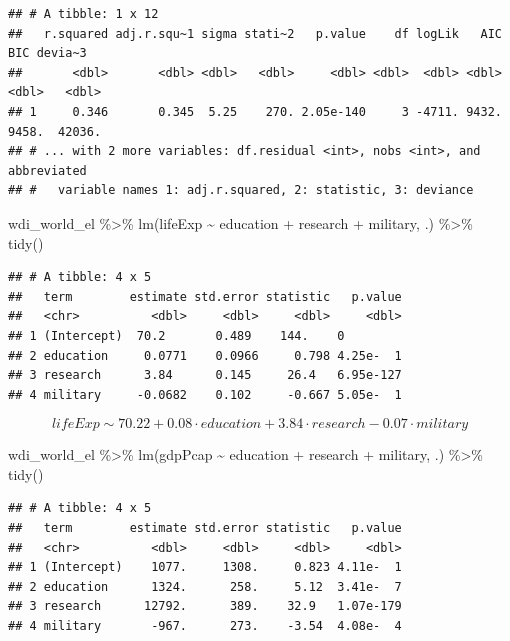 \documentclass[
]{article}
\newenvironment{Shaded}{\begin{snugshade}}{\end{snugshade}}
\newcommand{\FunctionTok}[1]{\textcolor[rgb]{0.00,0.00,0.00}{#1}}
\newcommand{\NormalTok}[1]{#1}
\newcommand{\SpecialCharTok}[1]{\textcolor[rgb]{0.00,0.00,0.00}{#1}}
\begin{document}
\begin{verbatim}
## # A tibble: 1 x 12
##   r.squared adj.r.squ~1 sigma stati~2   p.value    df logLik   AIC   BIC devia~3
##       <dbl>       <dbl> <dbl>   <dbl>     <dbl> <dbl>  <dbl> <dbl> <dbl>   <dbl>
## 1     0.346       0.345  5.25    270. 2.05e-140     3 -4711. 9432. 9458.  42036.
## # ... with 2 more variables: df.residual <int>, nobs <int>, and abbreviated
## #   variable names 1: adj.r.squared, 2: statistic, 3: deviance
\end{verbatim}

\begin{Shaded}
\begin{Highlighting}[]
\NormalTok{wdi\_world\_el }\SpecialCharTok{\%\textgreater{}\%} \FunctionTok{lm}\NormalTok{(lifeExp }\SpecialCharTok{\textasciitilde{}}\NormalTok{ education }\SpecialCharTok{+}\NormalTok{ research }\SpecialCharTok{+}\NormalTok{ military, .) }\SpecialCharTok{\%\textgreater{}\%} \FunctionTok{tidy}\NormalTok{()}
\end{Highlighting}
\end{Shaded}

\begin{verbatim}
## # A tibble: 4 x 5
##   term        estimate std.error statistic   p.value
##   <chr>          <dbl>     <dbl>     <dbl>     <dbl>
## 1 (Intercept)  70.2       0.489    144.    0        
## 2 education     0.0771    0.0966     0.798 4.25e-  1
## 3 research      3.84      0.145     26.4   6.95e-127
## 4 military     -0.0682    0.102     -0.667 5.05e-  1
\end{verbatim}

\[lifeExp \sim 70.22 + 0.08\cdot education + 3.84 \cdot research - 0.07 \cdot military\]

\begin{Shaded}
\begin{Highlighting}[]
\NormalTok{wdi\_world\_el }\SpecialCharTok{\%\textgreater{}\%} \FunctionTok{lm}\NormalTok{(gdpPcap }\SpecialCharTok{\textasciitilde{}}\NormalTok{ education }\SpecialCharTok{+}\NormalTok{ research }\SpecialCharTok{+}\NormalTok{ military, .) }\SpecialCharTok{\%\textgreater{}\%} \FunctionTok{tidy}\NormalTok{()}
\end{Highlighting}
\end{Shaded}

\begin{verbatim}
## # A tibble: 4 x 5
##   term        estimate std.error statistic   p.value
##   <chr>          <dbl>     <dbl>     <dbl>     <dbl>
## 1 (Intercept)    1077.     1308.     0.823 4.11e-  1
## 2 education      1324.      258.     5.12  3.41e-  7
## 3 research      12792.      389.    32.9   1.07e-179
## 4 military       -967.      273.    -3.54  4.08e-  4
\end{verbatim}
\end{document}
